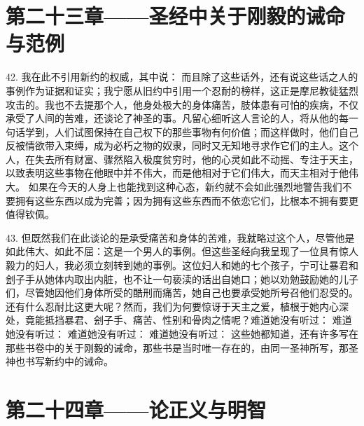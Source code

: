 
\section{第二十三章——圣经中关于刚毅的诫命与范例}

42. 我在此不引用新约的权威，其中说： 而且除了这些话外，还有说这些话之人的事例作为证据和证实；我宁愿从旧约中引用一个忍耐的榜样，这正是摩尼教徒猛烈攻击的。我也不去提那个人，他身处极大的身体痛苦，肢体患有可怕的疾病，不仅承受了人间的苦难，还谈论了神圣的事。凡留心细听这人言论的人，将从他的每一句话学到，人们试图保持在自己权下的那些事物有何价值；而这样做时，他们自己反被情欲带入束缚，成为必朽之物的奴隶，同时又无知地寻求作它们的主人。这个人，在失去所有财富、骤然陷入极度贫穷时，他的心灵如此不动摇、专注于天主，以致表明这些事物在他眼中并不伟大，而是他相对于它们伟大，而天主相对于他伟大。 如果在今天的人身上也能找到这种心态，新约就不会如此强烈地警告我们不要拥有这些东西以成为完善；因为拥有这些东西而不依恋它们，比根本不拥有要更值得钦佩。\par

43. 但既然我们在此谈论的是承受痛苦和身体的苦难，我就略过这个人，尽管他是如此伟大、如此不屈：这是一个男人的事例。但这些圣经向我呈现了一位具有惊人毅力的妇人，我必须立刻转到她的事例。这位妇人和她的七个孩子，宁可让暴君和刽子手从她体内取出内脏，也不让一句亵渎的话出自她口；她以劝勉鼓励她的儿子们，尽管她因他们身体所受的酷刑而痛苦，她自己也要承受她所号召他们忍受的。还有什么忍耐比这更大呢？然而，我们为何要惊讶于天主之爱，植根于她内心深处，竟能抵挡暴君、刽子手、痛苦、性别和骨肉之情呢？难道她没有听过： 难道她没有听过： 难道她没有听过： 难道她没有听过： 这些她都知道，还有许多写在那些书卷中的关于刚毅的诫命，那些书是当时唯一存在的，由同一圣神所写，那圣神也书写新约中的诫命。\par


\section{第二十四章——论正义与明智}

